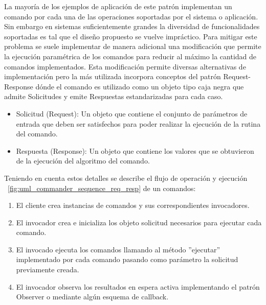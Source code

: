 La mayoría de los ejemplos de aplicación de este patrón implementan un comando
por cada una de las operaciones soportadas por el sistema o aplicación. Sin embargo en sistemas suficientemente grandes la diversidad de funcionalidades soportadas es tal que el diseño propuesto se vuelve impráctico.
Para mitigar este problema se suele implementar de manera adicional una modificación que permite la ejecución paramétrica de los comandos para reducir al máximo la cantidad de comandos implementados.
Esta modificación permite diversas alternativas de implementación pero la más utilizada incorpora  conceptos del patrón Request-Response dónde el comando es utilizado como un objeto tipo caja negra que admite Solicitudes y emite Respuestas estandarizadas para cada caso.
\begin{itemize}
	\item Solicitud (Request): Un objeto que contiene el conjunto de parámetros de entrada que deben ser satisfechos para poder realizar la ejecución de la rutina del comando.
	\item Respuesta (Response): Un objeto que contiene los valores que se obtuvieron de la ejecución del algoritmo del comando.
\end{itemize}

Teniendo en cuenta estos detalles se describe el flujo de operación y ejecución ~\ref{fig:uml_commander_sequence_req_resp} de un comandos:

\begin{enumerate}
	\item El cliente crea instancias de comandos y sus correspondientes invocadores. 
	\item El invocador crea e inicializa los objeto solicitud necesarios para ejecutar cada comando.
	\item El invocado ejecuta los comandos llamando al método ''ejecutar'' implementado por cada comando pasando como parámetro la solicitud previamente creada.
	\item El invocador observa los resultados en espera activa implementando el patrón Observer o mediante algún esquema de callback.
\end{enumerate}



